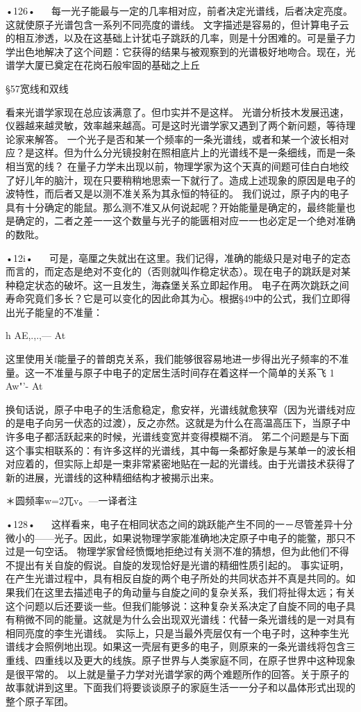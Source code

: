•126•
  
每一光子能最与一定的几率相对应，前者决定光谱线，后者决定亮度。这就使原子光谱包含一系列不同亮度的谱线。
文字描述是容易的，但计算电子云的相互渗透，以及在这基础上计犹屯子跳跃的几率，则是十分困难的。可是量子力学出色地解决了这个间题：它获得的结果与被观察到的光谱极好地吻合。现在，光谱学大厦已奠定在花岗石般牢固的基础之上丘

§57宽线和双线

看来光谱学家现在总应该满意了。但巾实并不是这样。
光谱分析技木发展迅速，仪器越来越灵敏，效率越来越高。可是这时光谱学家又遇到了两个新问题，等待理论家来解答。
一个光子是否和某一个频率的一条光谱线，或者和某一个波长相对应？是这样。但为什么分光镜投射在照相底片上的光谱线不是一条细线，而是一条相当宽的线？
在量子力学未出现以前，物理学家为这个天真的间题可佳白白地绞了好儿年的脑汁，现在只要稍稍地思索一下就行了。造成上述现象的原因是电子的波特性，而后者又是以测不准关系为其永恒的特征的。
我们说过，原子内的电子具有十分确定的能鼠。那么测不准又从何说起呢？开始能量是确定的，最终能量也是确定的，二者之差一一这个数量与光子的能匮相对应一一也必定足一个绝对准确的数阰。

•12i•
  
可是，亳厘之失就出在这里。我们记得，准确的能级只是对电子的定态而言的，而定态是绝对不变化的（否则就叫作稳定状态）。现在电子的跳跃是对某种稳定状态的破坏。这一且发生，海森堡关系立即起作用。
电子在两次跳跃之间寿命究竟们多长？它是可以变化的因此命其为心。根据§49中的公式，我们立即得出光子能皇的不准量：

h
AE,.,.,—
At

这里使用关f能量子的普朗克关系，我们能够很容易地进一步得出光子频率的不准量。这一不准量与原子中电子的定居生活时间存在着这样一个简单的关系飞
1
Aw"'-
At

换旬话说，原子中电子的生活愈稳定，愈安祥，光谱线就愈狭窄（因为光谱线对应的是电子向另一伏态的过渡），反之亦然。这就是为什么在高温高压下，当原子中许多电子都活跃起来的时候，光谱线变宽并变得模糊不消。
笫二个问题是与下面这个事实相联系的：有许多这样的光谱线，其中每一条都好象是与某单一的波长相对应着的，但实际上却是一束非常紧密地贴在一起的光谱线。由于光谱技术获得了新的进展，光谱线的这种精细结构才被揭示出来。

＊圆频率w=2兀v。—一译者注

•128•
  
这样看来，电子在相同状态之间的跳跃能产生不同的一－尽管差异十分微小的——光子。因此，如果说物理学家能准确地决定原子中电子的能鳖，那只不过是一句空话。
物理学家曾经愤慨地拒绝过有关测不准的猜想，但为此他们不得不提出有关自旋的假说。自旋的发现恰好是光谱的精细性质引起的。
事实证明，在产生光谱过程中，具有相反自旋的两个电子所处的共同状态并不真是共同的。如果我们在这里去描述电子的角动量与自旋之间的复杂关系，我们将扯得太远；有关这个问题以后还要谈一些。但我们能够说：这种复杂关系决定了自旋不同的电子具有稍微不同的能量。这就是为什么会出现双光谱线：代替一条光谱线的是一对具有相同亮度的李生光谱线。
实际上，只是当最外壳层仅有一个电子时，这种李生光谱线才会照例地出现。如果这一壳层有更多的电子，则原来的一条光谱线将包含三重线、四重线以及更大的线族。原子世界与人类家庭不同，在原子世界中这种现象是很平常的。
以上就是量子力学对光谱学家的两个难题所作的回答。关于原子的故事就讲到这里。下面我们将要谈谈原子的家庭生活一一分子和以晶体形式出现的整个原子军团。

